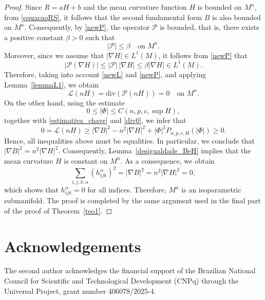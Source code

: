 \documentclass[leqno,11pt]{amsart}
\theoremstyle{plain}
\theoremstyle{definition}
\numberwithin{equation}{section}
\begin{document}
\begin{proof}

Since $R = aH + b$ and the mean curvature function $H$ is bounded on $M^n$, from \eqref{equacaoRS}, it follows that the second fundamental form $B$ is also bounded on $M^n$. Consequently, by \eqref{newP}, the operator $\mathcal{P}$ is bounded, that is, there exists a positive constant $\beta > 0$ such that
$$
|\mathcal{P}| \leq \beta \quad \text{on } M^n.
$$
Moreover, since we assume that $|\nabla H| \in L^1(M)$, it follows from \eqref{newP} that
\begin{equation}
|\mathcal{P}(\nabla H)| \leq |\mathcal{P}|\,|\nabla H|
\leq \beta |\nabla H| \in L^1(M).
\end{equation}
Therefore, taking into account \eqref{newL} and \eqref{newP}, and applying Lemma~\ref{lemmaL1}, we obtain
\begin{equation}\label{div0}
\mathcal{L}(nH) = \mathrm{div}(\mathcal{P}(nH)) = 0 \quad \text{on } M^n.
\end{equation}
On the other hand, using the estimate
$$
0 \leq |\Phi| \leq C(n,p,c,\sup H),
$$
together with \eqref{estimativa_chave} and \eqref{div0}, we infer that
\begin{equation}
0 = \mathcal{L}(nH)
\geq |\nabla B|^2 - n^2 |\nabla H|^2
+ |\Phi|^2 P_{n,p,c,H}(|\Phi|)
\geq 0.
\end{equation}
Hence, all inequalities above must be equalities. In particular, we conclude that
$
|\nabla B|^2 = n^2 |\nabla H|^2.$
Consequently, Lemma~\ref{desigualdade_BeH} implies that the mean curvature $H$ is constant on $M^n$. As a consequence, we obtain
$$
\sum_{i,j,k,\alpha} (h_{ijk}^{\alpha})^2
= |\nabla B|^2
= n^2 |\nabla H|^2
= 0,
$$
which shows that $h_{ijk}^{\alpha} = 0$ for all indices. Therefore, $M^n$ is an isoparametric submanifold. The proof is completed by the same argument used in the final part of the proof of Theorem~\ref{teo1}.


\end{proof}


\section*{Acknowledgements}
The second author acknowledges the financial support of the Brazilian National Council for Scientific and Technological Development (CNPq) through the Universal Project, grant number 406078/2025-4.
\end{document}
